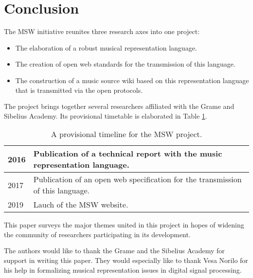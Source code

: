 \documentclass{article}
\begin{document}
\section{Conclusion}\label{sec:conclusion}
The MSW initiative reunites three research axes into one project:
\begin{itemize}
\item The elaboration of a robust musical representation language.
\item The creation of open web standards for the transmission of this
language.
\item The construction of a music source wiki based on this representation
language that is transmitted via the open protocols.
\end{itemize}
The project brings together several researchers affiliated with the Grame
and Sibelius Academy.  Its provisional timetable is elaborated in Table
\ref{tab:timeline}.
\begin{table}[h]
\begin{center}
\begin{tabular}{|l|p{6cm}|}\hline
2016 & Publication of a technical report with the music representation
language. \\\hline
2017 & Publication of an open web specification for the transmission of this
language. \\\hline
2019 & Lauch of the MSW website. \\\hline
\end{tabular}
\end{center}
 \caption{A provisional timeline for the MSW project.}
 \label{tab:timeline}
\end{table}
This paper surveys the major themes united in this project in hopes of
widening the community of researchers participating in its development.
\begin{acknowledgments}
The authors would like to thank the Grame and the Sibelius Academy for
support in writing this paper. They would especially like to thank Vesa
Norilo for his help in formalizing musical representation issues in
digital signal processing.
\end{acknowledgments} 


\end{document}
